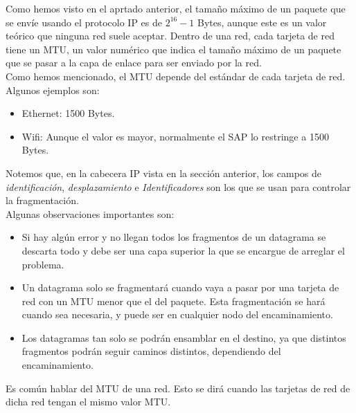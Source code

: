 Como hemos visto en el aprtado anterior, el tamaño máximo de un paquete que se envíe usando el protocolo \acrshort{IP} es de $2^{16}-1$ Bytes, aunque este es un valor teórico que ninguna red suele aceptar. 
Dentro de una red, cada tarjeta de red tiene un \acrfull{MTU}, un valor numérico que indica el tamaño máximo de un paquete que se pasar a la capa de enlace para ser enviado por la red.\\

Como hemos mencionado, el \acrshort{MTU} depende del estándar de cada tarjeta de red. Algunos ejemplos son:
\begin{itemize}
    \item Ethernet: 1500 Bytes.
    \item Wifi: Aunque el valor es mayor, normalmente el \acrshort{SAP} lo restringe a 1500 Bytes.
\end{itemize}

Notemos que, en la cabecera \acrshort{IP} vista en la sección anterior, los campos de \textit{identificación}, \textit{desplazamiento} e \textit{Identificadores} son los que se usan para controlar la fragmentación.\\

Algunas observaciones importantes son:
\begin{itemize}
    \item Si hay algún error y no llegan todos los fragmentos de un datagrama se descarta todo y debe ser una capa superior la que se encargue de arreglar el problema.
    \item Un datagrama solo se fragmentará cuando vaya a pasar por una tarjeta de red con un \acrshort{MTU} menor que el del paquete. Esta fragmentación se hará cuando sea necesaria, y puede ser en cualquier nodo del encaminamiento.
    \item Los datagramas tan solo se podrán ensamblar en el destino, ya que distintos fragmentos podrán seguir caminos distintos, dependiendo del encaminamiento.
\end{itemize}

\begin{observacion}
    Es común hablar del \acrshort{MTU} de una red. Esto se dirá cuando las tarjetas de red de dicha red tengan el mismo valor \acrshort{MTU}.
\end{observacion}

